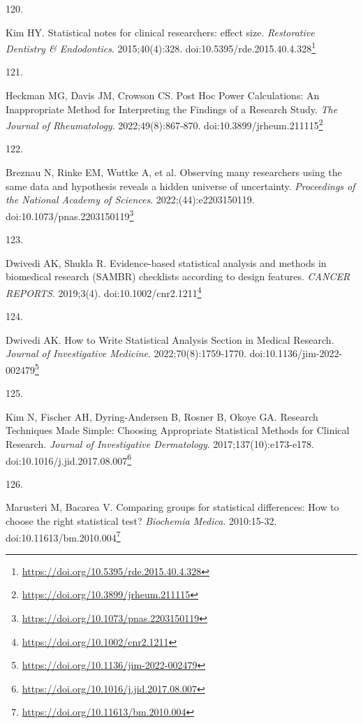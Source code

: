 \documentclass[
  a4paper,
]{book}
\newlength{\cslhangindent}
\newlength{\csllabelwidth}
\newlength{\cslentryspacingunit} %
\newenvironment{CSLReferences}[2] %
 {%
  \setlength{\parindent}{0pt}
  \ifodd #1
  \let\oldpar\par
  \def\par{\hangindent=\cslhangindent\oldpar}
  \fi
  \setlength{\parskip}{#2\cslentryspacingunit}
 }%
 {}
\newcommand{\CSLLeftMargin}[1]{\parbox[t]{\csllabelwidth}{#1}}
\newcommand{\CSLRightInline}[1]{\parbox[t]{\linewidth - \csllabelwidth}{#1}\break}
\renewcommand{\href}[2]{#2\footnote{\url{#1}}}
\begin{document}
\begin{CSLReferences}{0}{0}
\leavevmode{}%
\CSLLeftMargin{120. }%
\CSLRightInline{Kim HY. Statistical notes for clinical researchers: effect size. \emph{Restorative Dentistry \& Endodontics}. 2015;40(4):328. doi:\href{https://doi.org/10.5395/rde.2015.40.4.328}{10.5395/rde.2015.40.4.328}}

\leavevmode{}%
\CSLLeftMargin{121. }%
\CSLRightInline{Heckman MG, Davis JM, Crowson CS. Post Hoc Power Calculations: An Inappropriate Method for Interpreting the Findings of a Research Study. \emph{The Journal of Rheumatology}. 2022;49(8):867-870. doi:\href{https://doi.org/10.3899/jrheum.211115}{10.3899/jrheum.211115}}

\leavevmode{}%
\CSLLeftMargin{122. }%
\CSLRightInline{Breznau N, Rinke EM, Wuttke A, et al. Observing many researchers using the same data and hypothesis reveals a hidden universe of uncertainty. \emph{Proceedings of the National Academy of Sciences}. 2022;(44):e2203150119. doi:\href{https://doi.org/10.1073/pnas.2203150119}{10.1073/pnas.2203150119}}

\leavevmode{}%
\CSLLeftMargin{123. }%
\CSLRightInline{Dwivedi AK, Shukla R. Evidence{-}based statistical analysis and methods in biomedical research (SAMBR) checklists according to design features. \emph{CANCER REPORTS}. 2019;3(4). doi:\href{https://doi.org/10.1002/cnr2.1211}{10.1002/cnr2.1211}}

\leavevmode{}%
\CSLLeftMargin{124. }%
\CSLRightInline{Dwivedi AK. How to Write Statistical Analysis Section in Medical Research. \emph{Journal of Investigative Medicine}. 2022;70(8):1759-1770. doi:\href{https://doi.org/10.1136/jim-2022-002479}{10.1136/jim-2022-002479}}

\leavevmode{}%
\CSLLeftMargin{125. }%
\CSLRightInline{Kim N, Fischer AH, Dyring-Andersen B, Rosner B, Okoye GA. Research Techniques Made Simple: Choosing Appropriate Statistical Methods for Clinical Research. \emph{Journal of Investigative Dermatology}. 2017;137(10):e173-e178. doi:\href{https://doi.org/10.1016/j.jid.2017.08.007}{10.1016/j.jid.2017.08.007}}

\leavevmode{}%
\CSLLeftMargin{126. }%
\CSLRightInline{Marusteri M, Bacarea V. Comparing groups for statistical differences: How to choose the right statistical test? \emph{Biochemia Medica}. 2010:15-32. doi:\href{https://doi.org/10.11613/bm.2010.004}{10.11613/bm.2010.004}}


\end{CSLReferences}
\end{document}
